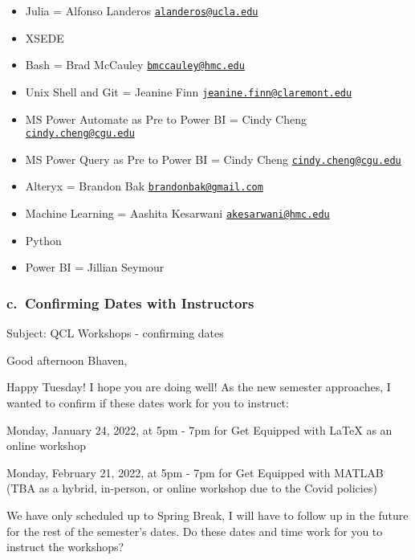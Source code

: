 \documentclass[
]{book}
\providecommand{\tightlist}{%
  \setlength{\itemsep}{0pt}\setlength{\parskip}{0pt}}
\begin{document}
\begin{itemize}
  \begin{itemize}
  \tightlist
  \item
    Julia = Alfonso Landeros \href{mailto:alanderos@ucla.edu}{\nolinkurl{alanderos@ucla.edu}}
  \item
    XSEDE
  \item
    Bash = Brad McCauley \href{mailto:bmccauley@hmc.edu}{\nolinkurl{bmccauley@hmc.edu}}
  \item
    Unix Shell and Git = Jeanine Finn \href{mailto:jeanine.finn@claremont.edu}{\nolinkurl{jeanine.finn@claremont.edu}}
  \item
    MS Power Automate as Pre to Power BI = Cindy Cheng \href{mailto:cindy.cheng@cgu.edu}{\nolinkurl{cindy.cheng@cgu.edu}}
  \item
    MS Power Query as Pre to Power BI = Cindy Cheng \href{mailto:cindy.cheng@cgu.edu}{\nolinkurl{cindy.cheng@cgu.edu}}
  \item
    Alteryx = Brandon Bak \href{mailto:brandonbak@gmail.com}{\nolinkurl{brandonbak@gmail.com}}
  \item
    Machine Learning = Aashita Kesarwani \href{mailto:akesarwani@hmc.edu}{\nolinkurl{akesarwani@hmc.edu}}
  \item
    Python
  \item
    Power BI = Jillian Seymour
  \end{itemize}
\end{itemize}

\hypertarget{c.-confirming-dates-with-instructors}{%
\subsubsection{\texorpdfstring{c.~Confirming Dates with Instructors }{c.~Confirming Dates with Instructors }}\label{c.-confirming-dates-with-instructors}}

Subject: QCL Workshops - confirming dates

Good afternoon Bhaven,

Happy Tuesday! I hope you are doing well! As the new semester approaches, I wanted to confirm if these dates work for you to instruct:

Monday, January 24, 2022, at 5pm - 7pm for Get Equipped with LaTeX as an online workshop

Monday, February 21, 2022, at 5pm - 7pm for Get Equipped with MATLAB (TBA as a hybrid, in-person, or online workshop due to the Covid policies)

We have only scheduled up to Spring Break, I will have to follow up in the future for the rest of the semester's dates. Do these dates and time work for you to instruct the workshops?
\end{document}
